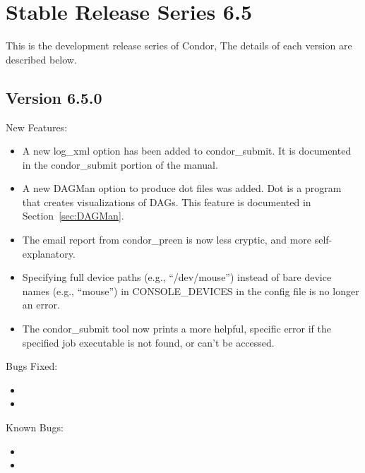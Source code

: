 \section{\label{sec:History-6-5}Stable Release Series 6.5}

This is the development release series of Condor,
The details of each version are described below.


\subsection{\label{sec:New-6-5-0}Version 6.5.0}
\noindent New Features:
\begin{itemize}

\item A new log\_xml option has been added to condor\_submit. It is
documented in the condor\_submit portion of the manual.

\item A new DAGMan option to produce dot files was added. Dot is a
program that creates visualizations of DAGs. This feature is
documented in Section~\ref{sec:DAGMan}.

\item The email report from condor_preen is now less cryptic, and
more self-explanatory.

\item Specifying full device paths (e.g., ``/dev/mouse'') instead of bare
device names (e.g., ``mouse'') in CONSOLE_DEVICES in the config file is no
longer an error.

\item The condor_submit tool now prints a more helpful, specific error if
the specified job executable is not found, or can't be accessed.

\end{itemize}

\noindent Bugs Fixed:
\begin{itemize}

\item 

\item 

\end{itemize}

\noindent Known Bugs:
\begin{itemize}
\item 

\item 

\end{itemize}
